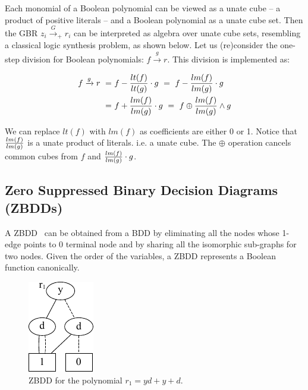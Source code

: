 Each monomial of a Boolean polynomial can be viewed as a unate cube --
a product of positive literals -- and a Boolean polynomial as a unate
cube set. Then the GBR $z_i\xrightarrow{G}_+ r_i$ can be interpreted
as algebra over unate cube sets, resembling a classical logic
synthesis problem, as shown below. Let us (re)consider the one-step
division for Boolean polynomials: $f\xrightarrow{g} r$. This division
is implemented as:  

{\small
\begin{equation}
\label{logic_syn}
\begin{split}
f \xrightarrow{g} r ~  = & ~ f - {{lt(f)} \over {lt(g)}} \cdot g ~ =  ~ f - {{lm(f)} \over {lm(g)}} \cdot g \\
= & ~ f + {{lm(f)} \over {lm(g)}} \cdot g ~ =  ~ f \oplus {{lm(f)} \over {lm(g)}} \wedge g
\end{split}
\end{equation}
}



We can replace $lt(f)$ with $lm(f)$ as coefficients are either 0 or 1. Notice that ${{lm(f)} \over {lm(g)}}$ is a unate product of
literals. i.e. a unate cube. The $\oplus$ operation cancels common
cubes from $f$ and ${{lm(f)} \over {lm(g)}}\cdot g$. 

\subsection{Zero Suppressed Binary Decision Diagrams (ZBDDs)}

A ZBDD~\cite{zbdd} can be obtained from a BDD by eliminating all the nodes whose 1-edge points to 0 terminal 
node and by sharing all the isomorphic sub-graphs for two nodes. Given the order of the variables, a ZBDD represents a 
Boolean function canonically.  

\begin{figure}[hbt]
\centering
\includegraphics[scale=1]{Preliminaries-Theory/r1_clean.pdf}
\caption{ZBDD for the polynomial $r_1 = yd + y + d$.}
\label{r1}
\end{figure}

